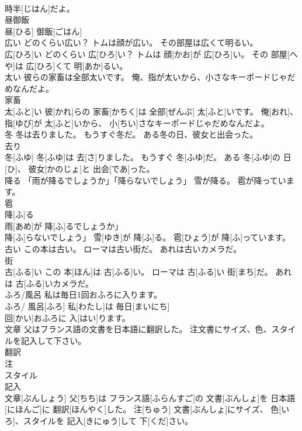 \documentclass[8pt]{extreport}
\begin{document}
\begin{CJK}{UTF8}{min}
\\	時半[じはん]だよ。
\\	昼御飯	
\\	昼[ひる] 御飯[ごはん]
\\	広い どのくらい広い？ トムは顔が広い。 その部屋は広くて明るい。	
\\	広[ひろ]い どのくらい 広[ひろ]い？ トムは 顔[かお]が 広[ひろ]い。 その 部屋[へや]は 広[ひろ]くて 明[あか]るい。
\\	太い 彼らの家畜は全部太いです。 俺、指が太いから、小さなキーポードじゃだめなんだよ。	
\\	家畜 
\\	太[ふと]い 彼[かれ]らの 家畜[かちく]は 全部[ぜんぶ] 太[ふと]いです。 俺[おれ]、 指[ゆび]が 太[ふと]いから、 小[ちい]さなキーポードじゃだめなんだよ。
\\	冬 冬は去りました。 もうすぐ冬だ。 ある冬の日、彼女と出会った。	
\\	去り 
\\	冬[ふゆ] 冬[ふゆ]は 去[さ]りました。 もうすぐ 冬[ふゆ]だ。 ある 冬[ふゆ]の 日[ひ]、 彼女[かのじょ]と 出会[であ]った。
\\	降る 「雨が降るでしょうか」「降らないでしょう」 雪が降る。 雹が降っています。	
\\	雹 
\\	降[ふ]る 
\\	雨[あめ]が 降[ふ]るでしょうか」
\\	降[ふ]らないでしょう」 雪[ゆき]が 降[ふ]る。 雹[ひょう]が 降[ふ]っています。
\\	古い この本は古い。 ローマは古い街だ。 あれは古いカメラだ。	
\\	街 
\\	古[ふる]い この 本[ほん]は 古[ふる]い。 ローマは 古[ふる]い 街[まち]だ。 あれは 古[ふる]いカメラだ。
\\	ふろ/風呂 私は毎日1回おふろに入ります。	
\\	ふろ/ 風呂[ふろ] 私[わたし]は 毎日[まいにち] 
\\	回[かい]おふろに 入[はい]ります。
\\	文章 父はフランス語の文書を日本語に翻訳した。 注文書にサイズ、色、スタイルを記入して下さい。	
\\	翻訳 
\\	注 
\\	スタイル 
\\	記入 
\\	文章[ぶんしょう] 父[ちち]は フランス語[ふらんすご]の 文書[ぶんしょ]を 日本語[にほんご]に 翻訳[ほんやく]した。 注[ちゅう] 文書[ぶんしょ]にサイズ、 色[いろ]、スタイルを 記入[きにゅう]して 下[くだ]さい。

\end{CJK}
\end{document}
